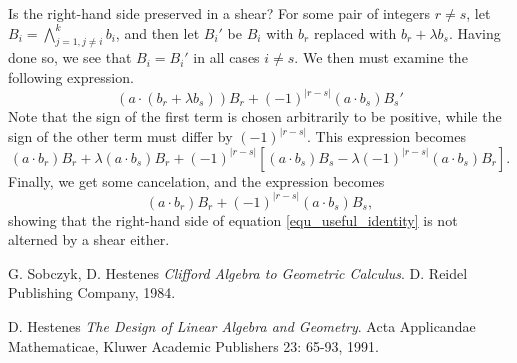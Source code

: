 \documentclass{birkjour}
\begin{document}
Is the right-hand side preserved in a shear?
For some pair of integers $r\neq s$, let $B_i=\bigwedge_{j=1,j\neq i}^k b_i$, and then let $B_i'$ be $B_i$ with $b_r$ replaced with $b_r+\lambda b_s$.
Having done so, we see that $B_i=B_i'$ in all cases $i\neq s$.  We then must examine the following expression.
\begin{equation}
(a\cdot(b_r+\lambda b_s))B_r+(-1)^{|r-s|}(a\cdot b_s)B_s'
\end{equation}
Note that the sign of the first term is chosen arbitrarily to be positive, while the sign of the other term must differ by $(-1)^{|r-s|}$.
This expression becomes
\begin{equation}
(a\cdot b_r)B_r + \lambda (a\cdot b_s)B_r + (-1)^{|r-s|}[(a\cdot b_s)B_s-\lambda(-1)^{|r-s|}(a\cdot b_s)B_r].
\end{equation}
Finally, we get some cancelation, and the expression becomes
\begin{equation}
(a\cdot b_r)B_r+(-1)^{|r-s|}(a\cdot b_s)B_s,
\end{equation}
showing that the right-hand side of equation \eqref{equ_useful_identity} is not alterned by a shear either.

\begin{thebibliography}{2}

G. Sobczyk, D. Hestenes
{\it Clifford Algebra to Geometric Calculus}.  D. Reidel Publishing Company, 1984.

D. Hestenes
{\it The Design of Linear Algebra and Geometry}.  Acta Applicandae Mathematicae, Kluwer Academic Publishers 23: 65-93, 1991.

\end{thebibliography}
\end{document}

